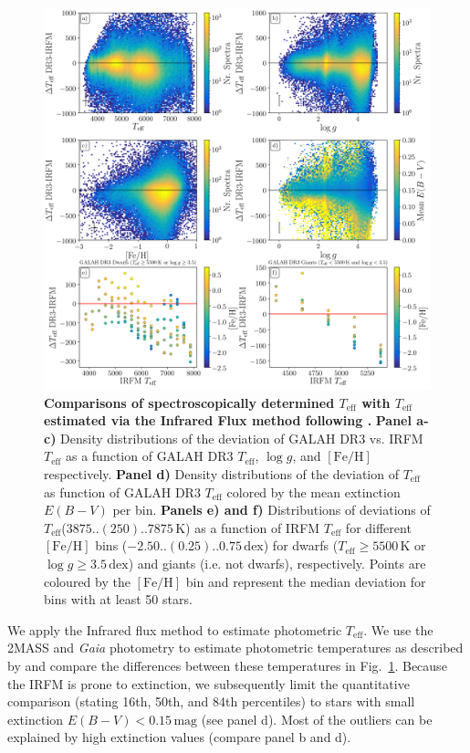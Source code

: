 \documentclass[fleqn,usenatbib,useAMS]{mnras}
\newcommand{\Teff}{$T_\mathrm{eff}$\xspace}
\newcommand{\logg}{$\log g$\xspace}
\newcommand{\feh}{$\mathrm{[Fe/H]}$\xspace}
\newcommand{\Gaia}{\textit{Gaia}\xspace}
\begin{document}
\begin{figure}
\centering
\includegraphics[width=\textwidth]{figures/plot_irfm.png}
\caption{
\textbf{Comparisons of spectroscopically determined $T_\text{eff}$ with $T_\text{eff}$ estimated via the Infrared Flux method following \citet{Casagrande2010, Casagrande2020}.} 
\textbf{Panel a-c)} Density distributions of the deviation of GALAH DR3 vs. IRFM \Teff as a function of GALAH DR3 \Teff, \logg, and \feh respectively. \textbf{Panel d)} Density distributions of the deviation of \Teff as function of GALAH DR3 \Teff colored by the mean extinction $E(B-V)$ per bin. \textbf{Panels e) and f)} Distributions of deviations of \Teff ($3875..(250)..7875\,\mathrm{K}$) as a function of IRFM \Teff for different \feh bins ($-2.50..(0.25)..0.75\,\mathrm{dex}$) for dwarfs ($T_\text{eff} \geq 5500\,\mathrm{K}$ or $\log g \geq 3.5\,\mathrm{dex}$) and giants (i.e. not dwarfs), respectively. Points are coloured by the \feh bin and represent the median deviation for bins with at least 50 stars.}
\label{fig:IRFM}
\end{figure}

We apply the Infrared flux method \citep[IRFM][]{Casagrande2010} to estimate photometric \Teff. We use the 2MASS and \Gaia photometry to estimate photometric temperatures as described by \citet{Casagrande2020} and compare the differences between these temperatures  in Fig.~\ref{fig:IRFM}. Because the IRFM is prone to extinction, we subsequently limit the quantitative comparison (stating 16th, 50th, and 84th percentiles) to stars with small extinction $E(B-V) < 0.15\,\mathrm{mag}$ (see panel d). Most of the outliers can be explained by high extinction values (compare panel b and d).
\end{document}
